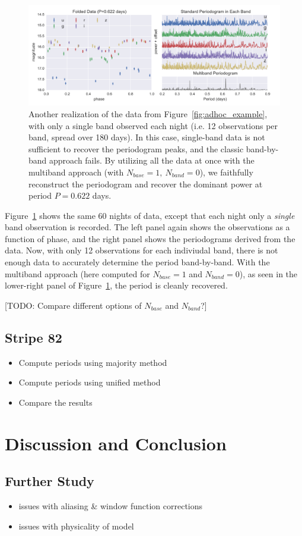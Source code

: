 \documentclass[12pt,preprint]{aastex}
\newcommand{\todo}[1]{{\color{red} [TODO: #1]}}
\newcommand{\Fig}[1]{Figure~\ref{fig:#1}}
\newcommand{\fig}[1]{\Fig{#1}}
\newcommand{\figlabel}[1]{\label{fig:#1}}
\begin{document}
\begin{figure}
  \centering
  \includegraphics[width=\textwidth]{fig05.pdf}
  \caption{
    Another realization of the data from \fig{adhoc_example}, with only a single
    band observed each night (i.e. 12 observations per band, spread over 180
    days). In this case, single-band data is not sufficient to recover the
    periodogram peaks, and the classic band-by-band approach fails.
    By utilizing all the data at once with the multiband approach
    (with $N_{base}=1,~N_{band}=0$),
    we faithfully reconstruct the periodogram and recover
    the dominant power at period $P=0.622$ days.
  } 
  \figlabel{multi_example}
\end{figure}

\fig{multi_example} shows the same 60 nights of data, except that each night only a {\it single} band observation is recorded. The left panel again shows the observations as a function of phase, and the right panel shows the periodograms derived from the data. Now, with only 12 observations for each indiviudal band, there is not enough data to accurately determine the period band-by-band. With the multiband approach (here computed for $N_{base}=1$ and $N_{band}=0$), as seen in the lower-right panel of \fig{multi_example}, the period is cleanly recovered.


\todo{Compare different options of $N_{base}$ and $N_{band}$?}


\subsection{Stripe 82}

\begin{itemize}
  \item Compute periods using majority method
  \item Compute periods using unified method
  \item Compare the results
\end{itemize}

\section{Discussion and Conclusion}

\subsection{Further Study}
\begin{itemize}
  \item issues with aliasing \& window function corrections
  \item issues with physicality of model
\end{itemize}





\end{document}
